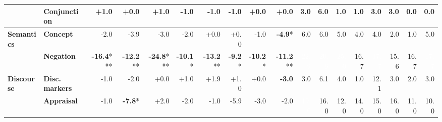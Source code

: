 \begin{table}[h]
{\begin{tabular}{llrrrrrrrrrrrrrrrr}
  & \textbf{Conjunction} & \cellcolor{green!1} +1.0 & \cellcolor{red!0} +0.0 & \cellcolor{green!1} +1.0 & \cellcolor{red!1} -1.0 & \cellcolor{red!1} -1.0 & \cellcolor{red!1} -1.0 & \cellcolor{red!0} +0.0 & \cellcolor{red!0} +0.0 & \cellcolor{blue!8} 3.0 & \cellcolor{blue!15} 6.0 & \cellcolor{blue!3} 1.0 & \cellcolor{blue!3} 1.0 & \cellcolor{blue!8} 3.0 & \cellcolor{blue!8} 3.0 & \cellcolor{blue!0} 0.0 & \cellcolor{blue!0} 0.0 \\
\midrule
\textbf{Semantics} & \textbf{Concept} & \cellcolor{red!3} -2.0 & \cellcolor{red!7} -3.9 & \cellcolor{red!5} -3.0 & \cellcolor{red!3} -2.0 & \cellcolor{red!0} +0.0 & \cellcolor{red!0} +0.0 & \cellcolor{red!1} -1.0 & \cellcolor{red!9} \textbf{-4.9}* & \cellcolor{blue!15} 6.0 & \cellcolor{blue!15} 6.0 & \cellcolor{blue!13} 5.0 & \cellcolor{blue!10} 4.0 & \cellcolor{blue!10} 4.0 & \cellcolor{blue!5} 2.0 & \cellcolor{blue!3} 1.0 & \cellcolor{blue!13} 5.0 \\
  & \textbf{Negation} & \cellcolor{red!20} \textbf{-16.4}*** & \cellcolor{red!20} \textbf{-12.2}** & \cellcolor{red!20} \textbf{-24.8}*** & \cellcolor{red!20} \textbf{-10.1}* & \cellcolor{red!20} \textbf{-13.2}** & \cellcolor{red!18} \textbf{-9.2}* & \cellcolor{red!20} \textbf{-10.2}* & \cellcolor{red!20} \textbf{-11.2}** & \cellcolor{blue!59} \textcolor{white}{22.9} & \cellcolor{blue!54} \textcolor{white}{20.8} & \cellcolor{blue!65} \textcolor{white}{25.0} & \cellcolor{blue!43} 16.7 & \cellcolor{blue!46} \textcolor{white}{17.7} & \cellcolor{blue!40} 15.6 & \cellcolor{blue!43} 16.7 & \cellcolor{blue!46} \textcolor{white}{17.7} \\
\midrule
\textbf{Discourse} & \textbf{Disc. markers} & \cellcolor{red!1} -1.0 & \cellcolor{red!3} -2.0 & \cellcolor{red!0} +0.0 & \cellcolor{green!1} +1.0 & \cellcolor{green!3} +1.9 & \cellcolor{green!1} +1.0 & \cellcolor{red!0} +0.0 & \cellcolor{red!5} \textbf{-3.0} & \cellcolor{blue!8} 3.0 & \cellcolor{blue!16} 6.1 & \cellcolor{blue!10} 4.0 & \cellcolor{blue!3} 1.0 & \cellcolor{blue!31} 12.1 & \cellcolor{blue!8} 3.0 & \cellcolor{blue!5} 2.0 & \cellcolor{blue!8} 3.0 \\
  & \textbf{Appraisal} & \cellcolor{red!1} -1.0 & \cellcolor{red!15} \textbf{-7.8}* & \cellcolor{green!3} +2.0 & \cellcolor{red!3} -2.0 & \cellcolor{red!1} -1.0 & \cellcolor{red!11} -5.9 & \cellcolor{red!5} -3.0 & \cellcolor{red!3} -2.0 & \cellcolor{blue!49} \textcolor{white}{19.0} & \cellcolor{blue!41} 16.0 & \cellcolor{blue!31} 12.0 & \cellcolor{blue!36} 14.0 & \cellcolor{blue!39} 15.0 & \cellcolor{blue!41} 16.0 & \cellcolor{blue!28} 11.0 & \cellcolor{blue!26} 10.0 \\

\end{tabular}}
\end{table}
